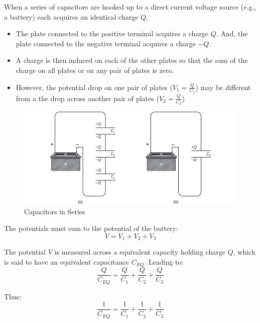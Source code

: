\documentclass[14pt]{memoir}
\begin{document}
When a series of capacitors are hooked up to a direct current voltage source (e.g., a battery) each acquires an identical charge $Q$. 

\begin{itemize}
\item The plate connected to the positive terminal acquires a charge $Q$. And, the plate connected to the negative terminal acquires a charge $-Q$. 
\item A charge is then induced on each of the other plates so that the sum of the charge on all plates or on any pair of plates is zero.
\item However, the potential drop on one pair of plates ($V_1=\frac{Q}{C_1}$) may be different from a the drop across another pair of plates ($V_2=\frac{Q}{C_2}$)
\end{itemize}

\begin{figure}[H]
\begin{center}
\includegraphics[scale=0.45]{fig/fig_08_11.jpg}
\caption{Capacitors in Series}
\label{fig:08_11}
\end{center}
\end{figure}

The potentials must sum to the potential of the battery:
\begin{equation}
V = V_1 + V_2 + V_3
\end{equation}

The potential $V$ is measured across a equivalent capacity holding charge $Q$, which is said to have an equivalent capacitance $C_{EQ}$. Leading to:
\begin{equation}
\frac{Q}{C_{EQ}} = \frac{Q}{C_{1}} + \frac{Q}{C_{2}} + \frac{Q}{C_{3}}
\end{equation}

Thus:
\begin{equation}
\frac{1}{C_{EQ}} = \frac{1}{C_{1}} + \frac{1}{C_{2}} + \frac{1}{C_{3}}
\end{equation}
\end{document}
